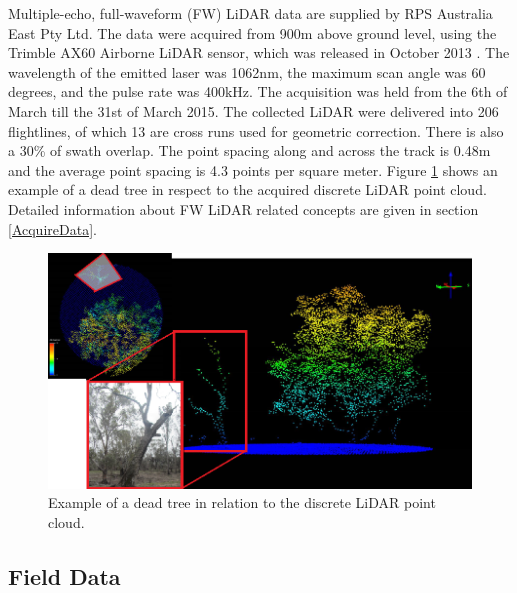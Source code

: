 \documentclass{subfiles}
\begin{document}
\par Multiple-echo, full-waveform (FW) LiDAR data are supplied by RPS Australia East Pty Ltd. The data were acquired from 900m above ground level, using the Trimble AX60 Airborne LiDAR sensor, which was released in October 2013 \cite{Trimble}. The wavelength of the emitted laser was 1062nm, the maximum scan angle was 60 degrees, and the pulse rate was 400kHz. The acquisition was held from the 6th of March till the 31st of March 2015.  The collected LiDAR were delivered into 206 flightlines, of which 13 are cross runs used for geometric correction. There is also a 30\% of swath overlap. The point spacing along and across the track  is 0.48m and the average point spacing is 4.3 points per square meter. Figure \ref{fig:DeadTreeInLiDAR} shows an example of a dead tree in respect to the acquired discrete LiDAR point cloud.   Detailed information about FW LiDAR related concepts are given in section \ref{AcquireData}.



\begin{figure} [h!]
	\centering
	\includegraphics[width=\textwidth]{img/dead/DeadTreeInLiDAR}
	\caption{Example of a dead tree in relation to the discrete LiDAR point cloud.}
	\label{fig:DeadTreeInLiDAR}
\end{figure}



\subsection{Field Data}\label{sec:fieldData}
\end{document}
